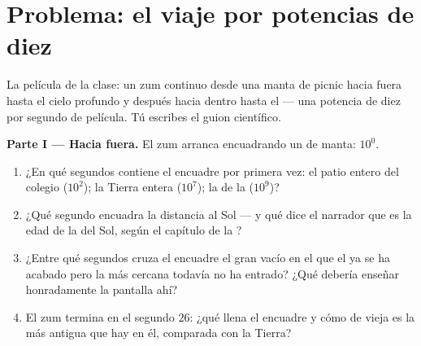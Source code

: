 \section{Problema: el viaje por potencias de diez}

\begin{problem}\label{pb:g9:atoms-to-galaxies:1}
La película de la clase: un zum continuo desde una manta de picnic
hacia fuera hasta el cielo profundo y después hacia dentro hasta el
 --- una potencia de diez por segundo de película. Tú
escribes el guion científico.

\medskip\noindent\textbf{Parte I --- Hacia fuera.}
El zum arranca encuadrando un  de manta: $10^{0}$.
\begin{enumerate}
  \item ¿En qué segundos contiene el encuadre por primera vez: el
        patio entero del colegio ($10^{2}$); la Tierra entera
        ($10^{7}$); la  de la  ($10^{9}$)?
  \item ¿Qué segundo encuadra la distancia al Sol --- y qué dice el
        narrador que es la edad de la  del Sol, según el capítulo
        de la ?
  \item ¿Entre qué segundos cruza el encuadre el gran vacío en el
        que el  ya se ha acabado pero la
         más cercana todavía no ha entrado? ¿Qué debería
        enseñar honradamente la pantalla ahí?
  \item El zum termina en el segundo $26$: ¿qué llena el encuadre y
        cómo de vieja es la  más antigua que hay en él,
        comparada con la Tierra?
\end{enumerate}


\end{problem}
